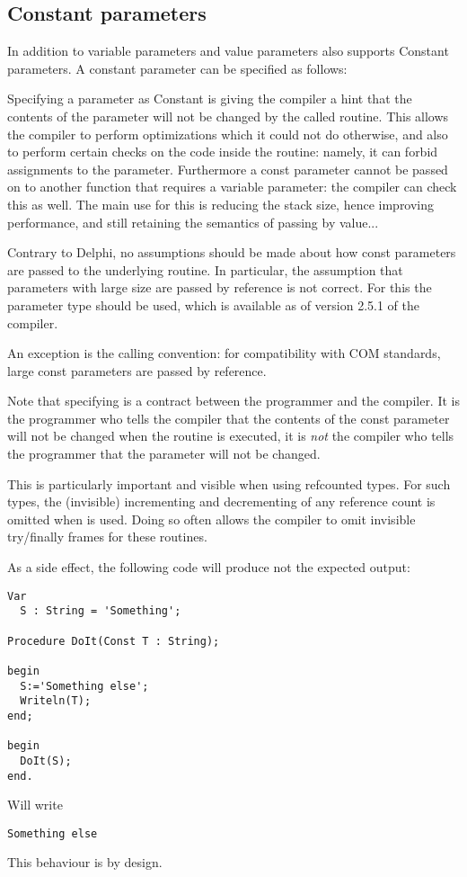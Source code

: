 \subsection{Constant parameters}
In addition to variable parameters and value parameters \fpc also supports
Constant parameters. A constant parameter can be specified as follows:

Specifying a parameter as Constant is giving the compiler a hint that the
contents of the parameter will not be changed by the called routine. This
allows the compiler to perform optimizations which it could not do otherwise, 
and also to perform certain checks on the code inside the routine: namely,
it can forbid assignments to the parameter. 
Furthermore a const parameter cannot be passed on to another
function that requires a variable parameter: the compiler can check this as
well.
The main use for this is reducing the stack size, hence improving
performance, and still retaining the semantics of passing by value...

\begin{remark}
Contrary to Delphi, no assumptions should be made about how const parameters
are passed to the underlying routine. In particular, the assumption that
parameters with large size are passed by reference is not correct. For this
the  parameter type should be used, which is available as of
version 2.5.1 of the compiler.

An exception is the  calling convention: for compatibility with
COM standards, large const parameters are passed by reference.
\end{remark}

\begin{remark}
Note that specifying  is a contract between the programmer and the
compiler. It is the programmer who tells the compiler that the contents of
the const parameter will not be changed when the routine is executed, it is 
{\em not} the compiler who tells the programmer that the parameter will not be 
changed. 

This is particularly important and visible when using refcounted types. 
For such types, the (invisible) incrementing and decrementing of any reference 
count is omitted when  is used. Doing so often allows the compiler 
to omit invisible try/finally frames for these routines.

As a side effect, the following code will produce not the expected output:
\begin{verbatim}
Var
  S : String = 'Something';

Procedure DoIt(Const T : String);

begin
  S:='Something else';
  Writeln(T);
end;

begin
  DoIt(S);
end.
\end{verbatim}
Will write 
\begin{verbatim}
Something else
\end{verbatim}
This behaviour is by design.
\end{remark}

